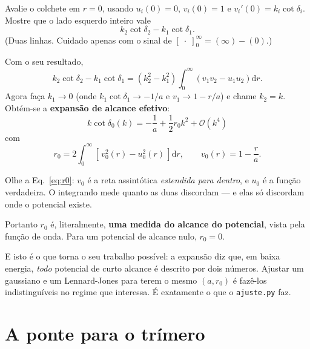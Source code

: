\documentclass[11pt,a4paper]{article}
\newcommand{\dd}{\mathrm{d}}
\begin{document}
\begin{suavez}
Avalie o colchete em $r=0$, usando $u_{i}(0)=0$, $v_{i}(0)=1$ e
$v_{i}'(0)=k_{i}\cot\delta_{i}$. Mostre que o lado esquerdo inteiro vale
\[
k_{2}\cot\delta_{2}-k_{1}\cot\delta_{1}.
\]
(Duas linhas. Cuidado apenas com o sinal de $[\;\cdot\;]_{0}^{\infty}=(\infty)-(0)$.)

\vspace{2.0cm}
\hrulefill
\end{suavez}

Com o seu resultado,
\begin{equation}
k_{2}\cot\delta_{2}-k_{1}\cot\delta_{1}
=(k_{2}^{2}-k_{1}^{2})\int_{0}^{\infty}\!\left(v_{1}v_{2}-u_{1}u_{2}\right)\dd r.
\end{equation}
Agora faça $k_{1}\to0$ (onde $k_{1}\cot\delta_{1}\to-1/a$ e $v_{1}\to1-r/a$) e chame
$k_{2}=k$. Obtém-se a \textbf{expansão de alcance efetivo}:
\begin{equation}
\boxed{\;k\cot\delta_{0}(k) = -\frac{1}{a} + \frac{1}{2}r_{0}k^{2}+\mathcal{O}(k^{4})\;}
\end{equation}
com
\begin{equation}
\boxed{\;r_{0} = 2\int_{0}^{\infty}\!\left[\,v_{0}^{2}(r)-u_{0}^{2}(r)\,\right]\dd r,
\qquad v_{0}(r)=1-\frac{r}{a}.\;}
\label{eq:r0}
\end{equation}

\begin{ideia}
Olhe a Eq.~\eqref{eq:r0}: $v_{0}$ é a reta assintótica \emph{estendida para dentro},
e $u_{0}$ é a função verdadeira. O integrando mede quanto as duas discordam — e elas
só discordam onde o potencial existe.

Portanto $r_{0}$ é, literalmente, \textbf{uma medida do alcance do potencial}, vista
pela função de onda. Para um potencial de alcance nulo, $r_{0}=0$.

E isto é o que torna o seu trabalho possível: a expansão diz que, em baixa energia,
\emph{todo} potencial de curto alcance é descrito por dois números. Ajustar um
gaussiano e um Lennard-Jones para terem o mesmo $(a,r_{0})$ é fazê-los
indistinguíveis no regime que interessa. É exatamente o que o \texttt{ajuste.py} faz.
\end{ideia}

\section{A ponte para o trímero}
\end{document}
